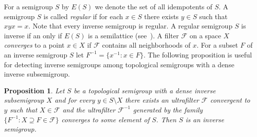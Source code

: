 \documentclass[12pt, twoside, leqno]{article}
\newtheorem{proposition}[theorem]{Proposition}
\theoremstyle{definition}
\numberwithin{equation}{section}
\newcommand{\F}{\mathcal F}
\begin{document}
For a semigroup $S$ by $E(S)$ we denote the set of all idempotents of $S$. 
A semigroup $S$ is called {\em regular} if for each $x\in S$ there exists $y\in S$ such that $xyx=x$. Note that every inverse semigroup is regular. A regular semigroup $S$ is inverse if an only if $E(S)$ is a semilattice (see~\cite[Theorem 5.1.1]{Howie}). A filter $\F$ on a space $X$ {\em converges} to a point $x\in X$ if $\F$ contains all neighborhoods of $x$. For a subset $F$ of an inverse semigroup $S$ let $F^{-1}=\{x^{-1}:x\in F\}$. 
The following proposition is useful for detecting inverse semigroups among topological semigroups with a dense inverse subsemigroup.

\begin{proposition}\label{tchar}
Let $S$ be a topological semigroup with a dense inverse subsemigroup $X$ and for every $y\in S\setminus X$ there exists an ultrafilter $\F$ convergent to $y$ such that $X\in \F$ and the ultrafilter $\F^{-1}$ generated by the family $\{F^{-1}: X\supseteq F\in \F\}$ converges to some element of $S$. Then $S$ is an inverse semigroup.  
\end{proposition}
\end{document}
